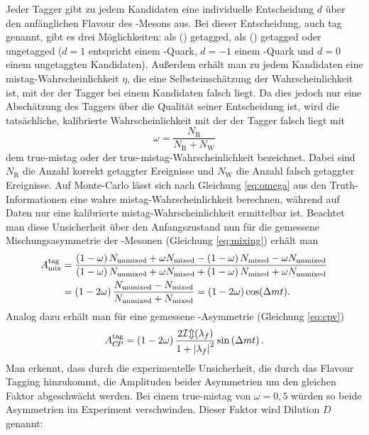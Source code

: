 Jeder Tagger gibt zu jedem Kandidaten eine individuelle Entscheidung $d$ über den anfänglichen Flavour des \B-Mesons aus. Bei dieser Entscheidung, auch tag genannt, gibt es drei Möglichkeiten: als \Bz (\bquarkbar\dquark) getagged, als \Bzb (\bquark\dquarkbar) getagged oder ungetagged ($d=1$ entspricht einem \bquarkbar-Quark, $d=-1$ einem \bquark-Quark und $d=0$ einem ungetaggten Kandidaten). Außerdem erhält man zu jedem Kandidaten eine mistag-Wahrscheinlichkeit $\eta$, die eine Selbsteinschätzung der Wahrscheinlichkeit ist, mit der der Tagger bei einem Kandidaten falsch liegt. Da dies jedoch nur eine Abschätzung des Taggers über die Qualität seiner Entscheidung ist, wird die tatsächliche, kalibrierte Wahrscheinlichkeit mit der der Tagger falsch liegt mit 
\begin{equation}
\omega=\frac{N_{\text{R}}}{N_{\text{R}}+N_{\text{W}}}\label{eq:omega}
\end{equation}
dem true-mistag oder der true-mistag-Wahrscheinlichkeit bezeichnet. Dabei sind $N_{\text{R}}$ die Anzahl korrekt getaggter Ereignisse und $N_{\text{W}}$ die Anzahl falsch getaggter Ereignisse. Auf Monte-Carlo lässt sich nach Gleichung \eqref{eq:omega} aus den Truth-Informationen eine wahre mistag-Wahrscheinlichkeit berechnen, während auf Daten nur eine kalibrierte mistag-Wahrscheinlichkeit ermittelbar ist. Beachtet man diese Unsicherheit über den Anfangszustand nun für die gemessene Mischungsasymmetrie der \B-Mesonen (Gleichung \eqref{eq:mixing}) erhält man
\begin{equation}
\begin{split}
A_{\text{mix}}^{\text{tag}}&=\frac{\left(1-\omega\right)N_\text{unmixed}+\omega N_\text{mixed}-\left(1-\omega\right)N_\text{mixed}-\omega N_\text{unmixed}}{\left(1-\omega\right)N_\text{unmixed}+\omega N_\text{mixed}+\left(1-\omega\right)N_\text{mixed}+\omega N_\text{unmixed}}\\
&=\left(1-2\omega\right)\frac{N_\text{unmixed}-N_\text{mixed}}{N_\text{unmixed}+N_\text{mixed}}=\left(1-2\omega\right)\cos({\Delta m} t).\label{eq:mischung}
\end{split}
\end{equation}
Analog dazu erhält man für eine gemessene \CP-Asymmetrie (Gleichung \eqref{eq:cpv})
\begin{equation}
A_{C\!P}^{\text{tag}}=\left(1-2\omega\right)\frac{2\mathcal{Im}(\lambda_f)}{1+\left|\lambda_f\right|^2}\sin\left({\Delta m} t\right).
\end{equation}
Man erkennt, dass durch die experimentelle Unsicherheit, die durch das Flavour Tagging hinzukommt, die Amplituden beider Asymmetrien um den gleichen Faktor abgeschwächt werden. Bei einem true-mistag von $\omega=0{,}5$ würden so beide Asymmetrien im Experiment verschwinden. Dieser Faktor wird Dilution $D$ genannt: 
